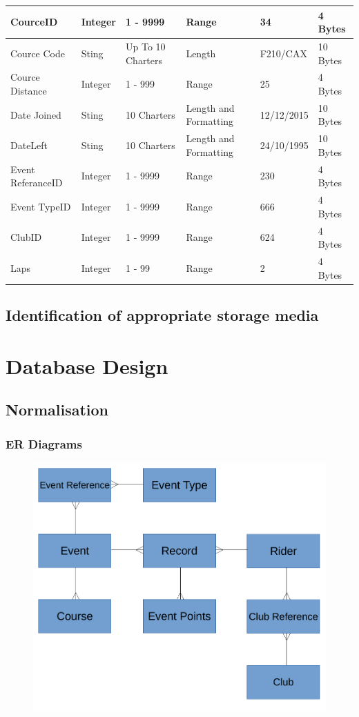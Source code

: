 \begin{tabular}{|p{1.5cm}|p{1.5cm}|p{1.8cm}|p{2.1cm}|l|p{2.5cm}|}
	CourceID & Integer & 1 - 9999 & Range & 34 & 4 Bytes \\ \hline
	Cource Code & Sting & Up To 10 Charters & Length & F210/CAX & 10 Bytes \\ \hline
	Cource Distance & Integer & 1 - 999 & Range & 25 & 4 Bytes \\ \hline
	Date Joined & Sting & 10 Charters & Length and Formatting & 12/12/2015 & 10 Bytes \\ \hline
	DateLeft & Sting & 10 Charters & Length and Formatting & 24/10/1995 & 10 Bytes \\ \hline
	Event ReferanceID & Integer & 1 - 9999 & Range & 230 & 4 Bytes \\ \hline
	Event TypeID & Integer & 1 - 9999 & Range & 666 & 4 Bytes \\ \hline
	ClubID & Integer & 1 - 9999 & Range & 624 & 4 Bytes \\ \hline
	Laps & Integer & 1 - 99 & Range & 2 & 4 Bytes \\ \hline
\end{tabular}
\subsection{Identification of appropriate storage media}

\section{Database Design}

\subsection{Normalisation}

\subsubsection{ER Diagrams}
\begin{figure}[H]
    \includegraphics[width=\textwidth]{./ER/ERDesing.pdf}
\end{figure}

